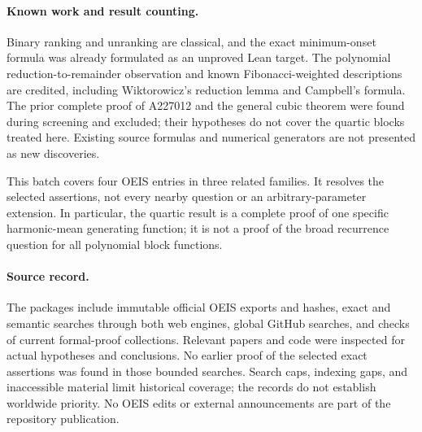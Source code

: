 \documentclass[11pt]{article}
\begin{document}
\paragraph{Known work and result counting.}
Binary ranking and unranking are classical, and the exact minimum-onset
formula was already formulated as an unproved Lean target. The polynomial
reduction-to-remainder observation and known Fibonacci-weighted descriptions
are credited, including Wiktorowicz's reduction lemma and Campbell's formula.
The prior complete proof of A227012 and the general cubic theorem were found
during screening and excluded; their hypotheses do not cover the quartic
blocks treated here. Existing source formulas and numerical generators are
not presented as new discoveries.

This batch covers four OEIS entries in three related families. It resolves
the selected assertions, not every nearby question or an arbitrary-parameter
extension. In particular, the quartic result is a complete proof of one
specific harmonic-mean generating function; it is not a proof of the broad
recurrence question for all polynomial block functions.

\paragraph{Source record.}
The packages include immutable official OEIS exports and hashes, exact and
semantic searches through both web engines, global GitHub searches, and
checks of current formal-proof collections. Relevant papers and code were
inspected for actual hypotheses and conclusions. No earlier proof of the
selected exact assertions was found in those bounded searches. Search caps,
indexing gaps, and inaccessible material limit historical coverage; the
records do not establish worldwide priority. No OEIS edits or external
announcements are part of the repository publication.
\end{document}
